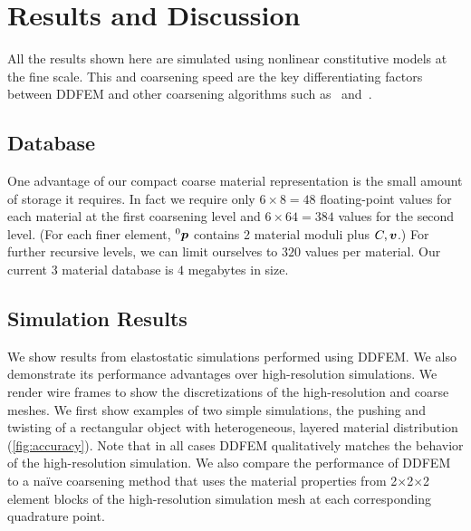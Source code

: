 \section{Results and Discussion}
\label{sec:result}
All the results shown here are simulated using nonlinear constitutive models at the fine scale. This and coarsening speed are the key differentiating factors between DDFEM and other coarsening algorithms such as~\citet{Nesme2009} and~\citet{Kharevych2009}.

\subsection{Database}
One advantage of our compact coarse material representation is the small amount of storage it requires. In fact we require only $6\times8=48$ floating-point values for each material at the first coarsening level and $6\times64=384$ values for the second level.
(For each finer element, $^0\bm{p}$ contains 2 material moduli plus $C, \bm{v}$.)
For further recursive levels, we can limit ourselves to $320$ values per material.
Our current 3 material database is $4$ megabytes in size.

\subsection{Simulation Results}
We show results from elastostatic simulations performed using DDFEM. We also demonstrate its performance advantages over high-resolution simulations. We render wire frames to show the discretizations of the high-resolution and coarse meshes. We first show examples of two simple simulations, the pushing and twisting of a rectangular object with heterogeneous, layered material distribution (\autoref{fig:accuracy}). Note that in all cases DDFEM qualitatively matches the behavior of the high-resolution simulation. We also compare the performance of DDFEM to a na\"{i}ve coarsening method that uses the material properties from 2$\times$2$\times$2 element blocks of the high-resolution simulation mesh at each corresponding quadrature point.  

